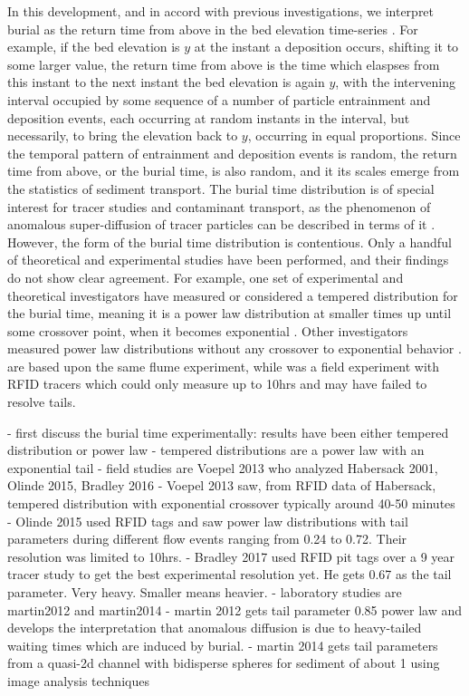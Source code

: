 \documentclass{article}
\begin{document}
In this development, and in accord with previous investigations, we interpret burial as the return time from above in the bed elevation time-series \citep{Voepel2013, Martin2014, Bradley2017}. For example, if the bed elevation is $y$ at the instant a deposition occurs, shifting it to some larger value, the return time from above is the time which elaspses from this instant to the next instant the bed elevation is again $y$, with the intervening interval occupied by some sequence of a number of particle entrainment and deposition events, each occurring at random instants in the interval, but necessarily, to bring the elevation back to $y$, occurring in equal proportions. Since the temporal pattern of entrainment and deposition events is random, the return time from above, or the burial time, is also random, and it its scales emerge from the statistics of sediment transport. The burial time distribution is of special interest for tracer studies and contaminant transport, as the phenomenon of anomalous super-diffusion of tracer particles can be described in terms of it \citep{Schumer2009, Martin2012, Zhang2012}. 
However, the form of the burial time distribution is contentious. Only a handful of theoretical and experimental studies have been performed, and their findings do not show clear agreement. For example, one set of experimental and theoretical investigators have measured or considered a tempered distribution for the burial time, meaning it is a power law distribution at smaller times up until some crossover point, when it becomes exponential \citep{Zhang2012,Voepel2013}.
Other investigators measured power law distributions without any crossover to exponential behavior \cite{Martin2012,Martin2014,Olinde2015,Bradley2017}. 
\citet{Martin2012, Martin2014} are based upon the same flume experiment, while \citet{Olinde2015} was a field experiment with RFID tracers which could only measure up to 10hrs and may have failed to resolve tails. 
 

- first discuss the burial time experimentally: results have been either tempered distribution or power law
- tempered distributions are a power law with an exponential tail 
- field studies are Voepel 2013 who analyzed Habersack 2001, Olinde 2015, Bradley 2016
- Voepel 2013 saw, from RFID data of Habersack, tempered distribution with exponential crossover typically around 40-50 minutes 
- Olinde 2015 used RFID tags and saw power law distributions with tail parameters during different flow events ranging from 0.24 to 0.72. Their resolution was limited to 10hrs. 
- Bradley 2017 used RFID pit tags over a 9 year tracer study to get the best experimental resolution yet. He gets 0.67 as the tail parameter. Very heavy. Smaller means heavier. 
- laboratory studies are martin2012 and martin2014
- martin 2012 gets tail parameter 0.85 power law and develops the interpretation that anomalous diffusion is due to heavy-tailed waiting times which are induced by burial. 
- martin 2014 gets tail parameters from a quasi-2d channel with bidisperse spheres for sediment of about 1 using image analysis techniques
\end{document}
